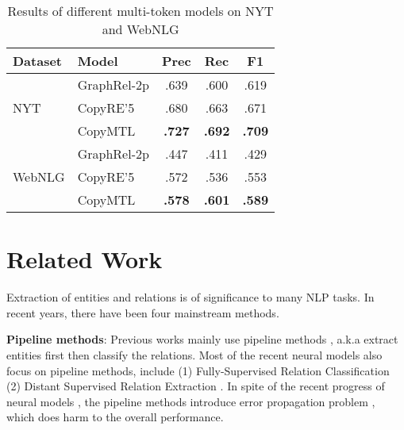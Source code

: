 \documentclass[letterpaper]{article} \usepackage{aaai20}  \usepackage{times}  \usepackage{helvet} \usepackage{courier}  \usepackage[hyphens]{url}  \usepackage{graphicx}
\begin{document}
  
      \begin{table}[t]
        \centering
        \begin{tabular}{l|l|ccc}
        \hline
        Dataset                 & Model       & Prec          & Rec           & F1            \\ \hline
        \multirow{3}{*}{NYT}    & GraphRel-2p & .639          & .600          & .619          \\
                                & CopyRE'5    & .680          & .663          & .671          \\
                                & CopyMTL     & \textbf{.727} & \textbf{.692} & \textbf{.709} \\ \hline
        \multirow{3}{*}{WebNLG} & GraphRel-2p & .447          & .411          & .429          \\
                                & CopyRE'5    & .572          & .536          & .553          \\
                                & CopyMTL     & \textbf{.578} & \textbf{.601} & \textbf{.589} \\ \hline
        \end{tabular}
        \caption{Results of different multi-token models on NYT and WebNLG}\label{tab:copy5}

        \end{table}
  
  


  


  
  
  
  


  
  
  




  
  
  


  
  \section{Related Work}
  
  
  Extraction of entities and relations is of significance to many NLP tasks. In recent years, there have been four mainstream methods.
  
   \textbf{Pipeline methods}: Previous works mainly use pipeline methods \cite{pipeline1}, a.k.a extract entities first then classify the relations. 
  Most of the recent neural models also focus on pipeline methods, include (1) Fully-Supervised Relation Classification \cite{re_full} (2) Distant Supervised Relation Extraction \cite{dsre}. In spite of the recent progress of neural models  \cite{nrc_lstm,zeng14,nrc_walk,noise3},  the pipeline methods introduce error propagation problem \cite{interaction}, which does harm to the overall performance. 
  
\end{document}
